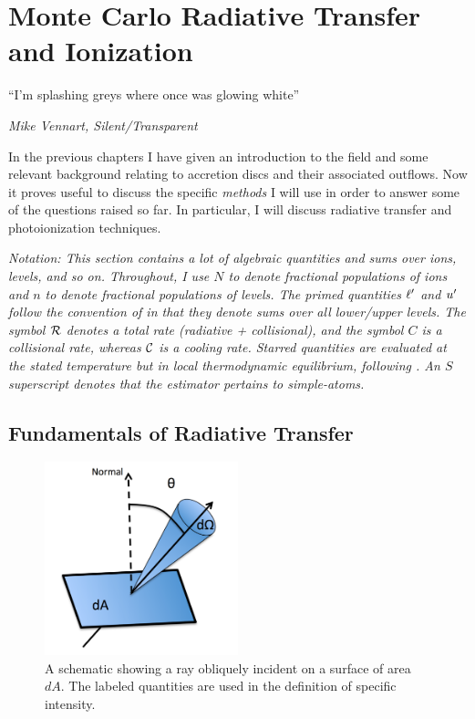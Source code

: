 \chapter{Monte Carlo Radiative Transfer and Ionization}

\epigraph{``I'm splashing greys where once was glowing white''}{{\sl Mike Vennart, Silent/Transparent}}

In the previous chapters I have given an introduction to the field and 
some relevant background relating to accretion 
discs and their associated outflows. Now it proves useful
to discuss the specific {\em methods} I will use
in order to answer some of the questions raised so far.
In particular, I will discuss radiative transfer and photoionization
techniques.

{\sl Notation: This section contains a lot of algebraic quantities and sums over
ions, levels, and so on. Throughout, I use $N$ to denote fractional
populations of ions and $n$ to denote fractional populations of levels. 
The primed quantities ${\ell^\prime}$ and ${u^\prime}$ follow the convention of 
\cite{lucy2002} in that they denote sums over all lower/upper levels.
The symbol ${\cal R}$ denotes a total rate (radiative + collisional), 
and the symbol $C$ is a collisional rate, whereas ${\cal C}$ is a cooling 
rate. Starred quantities are evaluated at the stated temperature but 
in local thermodynamic equilibrium, following \cite{mihalas}. An $S$ 
superscript denotes that the estimator pertains to simple-atoms.
}



\section{Fundamentals of Radiative Transfer}
\begin{figure}
\centering
\includegraphics[width=0.5\textwidth]{figures/03-radtrans/rays_schematic.png}
\caption
{
A schematic showing a ray obliquely incident on a surface of area $dA$.
The labeled quantities are used in the definition of specific intensity.
} 
\label{fig:ray}
\end{figure}

